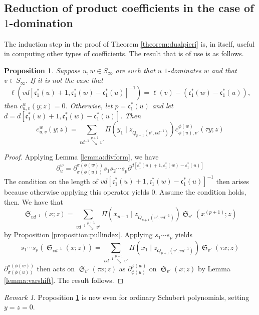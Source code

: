 \documentclass{amsart}
\newtheorem{corollary}[lemma]{Corollary}
\newtheorem{proposition}[lemma]{Proposition}
\theoremstyle{definition}
\theoremstyle{remark}
\newtheorem*{remark}{Remark}
\numberwithin{equation}{subsection}
\DeclareMathOperator{\sch}{\mathfrak{S}}
\newcommand{\smpfu}{\mathsf{\Pi}}
\newcommand{\smpre}[2]{\ensuremath{}\smpfu\left( #1 \mid #2\right)}
\newcommand{\downvar}[1]{\stackrel{#1}{\searrow}}
\newcommand{\shifthom}{\tau}
\newcommand{\code}{\mathfrak{c}}
\begin{document}

\subsection{Reduction of product coefficients in the case of \texorpdfstring{$1$}{1}-domination}

The induction step in the proof of Theorem \ref{theorem:dualpieri} is, in itself, useful in computing other types of coefficients. The result that is of use is as follows.

\begin{proposition} \label{proposition:oneshift}
	Suppose $u,w\in S_\infty$ are such that $u$ $1$-dominates $w$ and that $v\in S_\infty$. If it is not the case that $$\ell(vd[\code_1^*(u)+1,\code_1^*(w)-\code_1^*(u)]^{-1}) = \ell(v)-(\code_1^*(w) - \code_1^*(u)),$$
then $c_{u,v}^w(y;z)=0$. Otherwise, let $p=\code_1^*(u)$ and let $d=d[\code_1^*(u)+1,\code_1^*(w)-\code_1^*(u)]$. Then
	$$c_{u,v}^w(y;z)=\sum_{vd^{-1}\downvar{p+1}v'}\smpre{y_1}{z_{Q_{p+1}(v',vd^{-1})}}c_{\phi(u),v'}^{\phi(w)}(\shifthom y;z)$$
\end{proposition}
\begin{proof}
	Applying Lemma \ref{lemma:divform}, we have
	$$\partial_u^w=\partial_{\sigma(\phi(u))}^{\sigma(\phi(w))}s_1s_2\cdots s_p\partial^{d[\code_1^*(u)+1,\code_1^*(w)-\code_1^*(u)]}$$
	The condition on the length of $vd[\code_1^*(u)+1,\code_1^*(w)-\code_1^*(u)]^{-1}$ then arises because otherwise applying this operator yields $0$. Assume the condition holds, then. We have that
	$$\sch_{vd^{-1}}(x;z)=\sum_{vd^{-1}\downvar{p+1}v'}\smpre{x_{p+1}}{z_{Q_{p+1}(v',vd^{-1})}}\sch_{v'}(x^{(p+1)};z)$$
	by Proposition \ref{proposition:pullindex}. Applying $s_1\cdots s_p$ yields
	$$s_1\cdots s_p(\sch_{vd^{-1}}(x;z))=\sum_{vd^{-1}\downvar{p+1}v'}\smpre{x_1}{z_{Q_{p+1}(v',vd^{-1})}}\sch_{v'}(\shifthom x;z)$$
	$\partial_{\sigma(\phi(u))}^{\sigma(\phi(w))}$ then acts on $\sch_{v'}(\shifthom x;z)$ as $\partial_{\phi(u)}^{\phi(w)}$ on $\sch_{v'}(x;z)$ by Lemma \ref{lemma:varshift}. The result follows.
\end{proof}

\begin{remark}
	Proposition \ref{proposition:oneshift} is new even for ordinary Schubert polynomials, setting $y=z=0$.
\end{remark}
\end{document}
